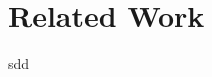 \documentclass[../document.tex]{subfiles}
\begin{document}
\section{Related Work}
sdd
\end{document}
